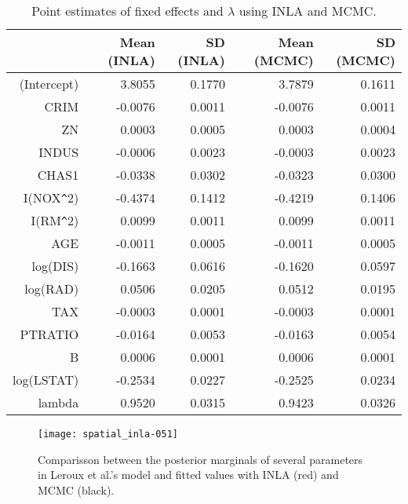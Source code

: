 \documentclass[article]{jss}
\begin{document}

\begin{table}[ht]
\centering
\begin{tabular}{rrrrr}
  \hline
 & Mean (INLA) & SD (INLA) & Mean (MCMC) & SD (MCMC) \\ 
  \hline
(Intercept) & 3.8055 & 0.1770 & 3.7879 & 0.1611 \\ 
  CRIM & -0.0076 & 0.0011 & -0.0076 & 0.0011 \\ 
  ZN & 0.0003 & 0.0005 & 0.0003 & 0.0004 \\ 
  INDUS & -0.0006 & 0.0023 & -0.0003 & 0.0023 \\ 
  CHAS1 & -0.0338 & 0.0302 & -0.0323 & 0.0300 \\ 
  I(NOX\verb|^|2) & -0.4374 & 0.1412 & -0.4219 & 0.1406 \\ 
  I(RM\verb|^|2) & 0.0099 & 0.0011 & 0.0099 & 0.0011 \\ 
  AGE & -0.0011 & 0.0005 & -0.0011 & 0.0005 \\ 
  log(DIS) & -0.1663 & 0.0616 & -0.1620 & 0.0597 \\ 
  log(RAD) & 0.0506 & 0.0205 & 0.0512 & 0.0195 \\ 
  TAX & -0.0003 & 0.0001 & -0.0003 & 0.0001 \\ 
  PTRATIO & -0.0164 & 0.0053 & -0.0163 & 0.0054 \\ 
  B & 0.0006 & 0.0001 & 0.0006 & 0.0001 \\ 
  log(LSTAT) & -0.2534 & 0.0227 & -0.2525 & 0.0234 \\ 
  lambda & 0.9520 & 0.0315 & 0.9423 & 0.0326 \\ 
   \hline
\end{tabular}
\caption{Point estimates of fixed effects and $\lambda$ using INLA and MCMC.} 
\label{tab:leroux}
\end{table}

\begin{figure}[h]
\begin{center}
\texttt{[image: spatial\_inla-051]}
\end{center}
\caption{Comparisson between the posterior marginals of several parameters in 
Leroux et al.'s model and fitted values with INLA (red) and MCMC (black).}
\label{fig:leroux}
\end{figure}
\end{document}
